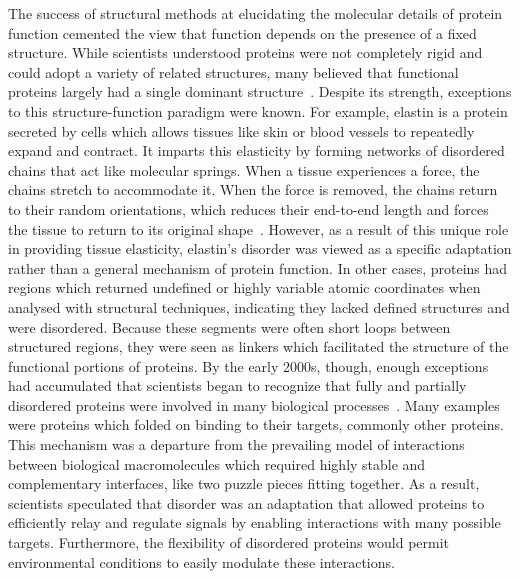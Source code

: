 The success of structural methods at elucidating the molecular details of protein function cemented the view that function depends on the presence of a fixed structure. While scientists understood proteins were not completely rigid and could adopt a variety of related structures, many believed that functional proteins largely had a single dominant structure~\cite{Karush1950}. Despite its strength, exceptions to this structure-function paradigm were known. For example, elastin is a protein secreted by cells which allows tissues like skin or blood vessels to repeatedly expand and contract. It imparts this elasticity by forming networks of disordered chains that act like molecular springs. When a tissue experiences a force, the chains stretch to accommodate it. When the force is removed, the chains return to their random orientations, which reduces their end-to-end length and forces the tissue to return to its original shape~\cite{Vrhovski1998, Alberts2014}. However, as a result of this unique role in providing tissue elasticity, elastin's disorder was viewed as a specific adaptation rather than a general mechanism of protein function. In other cases, proteins had regions which returned undefined or highly variable atomic coordinates when analysed with structural techniques, indicating they lacked defined structures and were disordered. Because these segments were often short loops between structured regions, they were seen as linkers which facilitated the structure of the functional portions of proteins. By the early 2000s, though, enough exceptions had accumulated that scientists began to recognize that fully and partially disordered proteins were involved in many biological processes~\cite{Plaxco1997, Wright1999, Dunker2001}. Many examples were proteins which folded on binding to their targets, commonly other proteins. This mechanism was a departure from the prevailing model of interactions between biological macromolecules which required highly stable and complementary interfaces, like two puzzle pieces fitting together. As a result, scientists speculated that disorder was an adaptation that allowed proteins to efficiently relay and regulate signals by enabling interactions with many possible targets. Furthermore, the flexibility of disordered proteins would permit environmental conditions to easily modulate these interactions.

